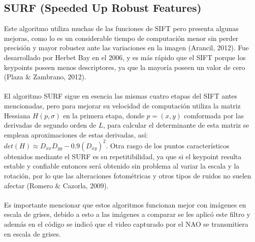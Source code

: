 \documentclass[letterpaper]{article}
\begin{document}
\subsection{SURF (Speeded Up Robust Features)}
Este algoritmo utiliza muchas de las funciones de SIFT pero presenta algunas mejoras, como lo es un considerable tiempo de computación menor sin perder precisión y mayor robustez ante las variaciones en la imagen (Arancil, 2012). Fue desarrollado por Herbet Bay en el 2006, y es más rápido que el SIFT porque los keypoints poseen menos descriptores, ya que la mayoría poseen un valor de cero (Plaza $\&$ Zambrano, 2012).\\\\
El algoritmo SURF sigue en esencia las mismas cuatro etapas del SIFT antes mencionadas, pero para mejorar su velocidad de computación utiliza la matriz Hessiana $H(p,\sigma)$ en la primera etapa, donde $p=(x,y)$ comformada por las derivadas de segundo orden de $L$, para calcular el determinante de esta matriz se emplean aproximaciones de estas derivadas, así: $ det(H)\approx D_{xx}D_{yy}-0.9(D_{xy})^{2} $. Otra rasgo de los puntos característicos obtenidos mediante el SURF es su repetitibilidad, ya que si el keypoint resulta estable y confiable entonces será obtenido sin problema al variar la escala y la rotación, por lo que las alteraciones fotométricas y otros tipos de ruidos no suelen afectar (Romero $\&$ Cazorla, 2009).\\\\
Es importante mencionar que estos algoritmos funcionan mejor con imágenes en escala de grises, debido a esto a las imágenes a comparar se les aplicó este filtro y además en el código se indicó que el video capturado por el NAO se transmitiera en escala de grises.\\\\
\end{document}
